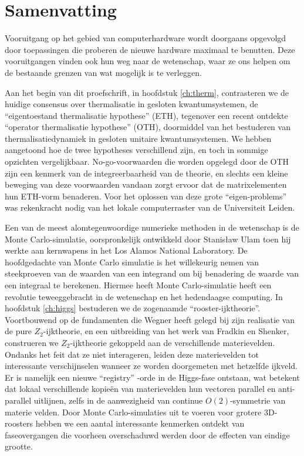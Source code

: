 \newpage
\thispagestyle{empty}

\chapter*{Samenvatting}
\label{Samenvatting}

Vooruitgang op het gebied van computerhardware wordt doorgaans opgevolgd door toepassingen die proberen de nieuwe hardware maximaal te benutten. Deze vooruitgangen vinden ook hun weg naar de wetenschap, waar ze ons helpen om de bestaande grenzen van wat mogelijk is te verleggen. 

Aan het begin van dit proefschrift, in hoofdstuk \ref{ch:therm}, contrasteren we de huidige consensus over thermalisatie in gesloten kwantumsystemen, de ``eigentoestand thermalisatie hypothese'' (ETH), tegenover een recent ontdekte ``operator thermalisatie hypothese'' (OTH), doormiddel van het bestuderen van thermalisatiedynamiek in gesloten unitaire kwantumsystemen. We hebben aangetoond hoe de twee hypotheses verschillend zijn, en toch in sommige opzichten vergelijkbaar. No-go-voorwaarden die worden opgelegd door de OTH zijn een kenmerk van de integreerbaarheid van de theorie, en slechts een kleine beweging van deze voorwaarden vandaan zorgt ervoor dat de matrixelementen hun ETH-vorm benaderen. Voor het oplossen van deze grote ``eigen-problems'' was rekenkracht nodig van het lokale computerraster van de Universiteit Leiden.

Een van de meest alomtegenwoordige numerieke methoden in de wetenschap is de Monte Carlo-simulatie, oorspronkelijk ontwikkeld door Stanisław Ulam toen hij werkte aan kernwapens in het Los Alamos National Laboratory. De hoofdgedachte van Monte Carlo simulatie is het willekeurig nemen van steekproeven van de waarden van een integrand om bij benadering de waarde van een integraal te berekenen. Hiermee heeft Monte Carlo-simulatie heeft een revolutie teweeggebracht in de wetenschap en het hedendaagse computing. In hoofdstuk \ref{ch:higgs} bestuderen we de zogenaamde ``rooster-ijktheorie''. Voortbouwend op de fundamenten die Wegner heeft gelegd bij zijn realisatie van de pure $Z_2$-ijktheorie, en een uitbreiding van het werk van Fradkin en Shenker, construeren we $Z_2$-ijktheorie gekoppeld aan de verschillende materievelden. Ondanks het feit dat ze niet interageren, leiden deze materievelden tot interessante verschijnselen wanneer ze worden doorgemeten met hetzelfde ijkveld. Er is namelijk een nieuwe ``registry'' -orde in de Higgs-fase ontstaan, wat betekent dat lokaal verschillende kopieën van materievelden hun vectoren parallel en anti-parallel uitlijnen, zelfs in de aanwezigheid van continue $O(2)$-symmetrie van materie velden. \newpage Door Monte Carlo-simulaties uit te voeren voor grotere 3D-roosters hebben we een aantal interessante kenmerken ontdekt van faseovergangen die voorheen overschaduwd werden door de effecten van eindige grootte.

